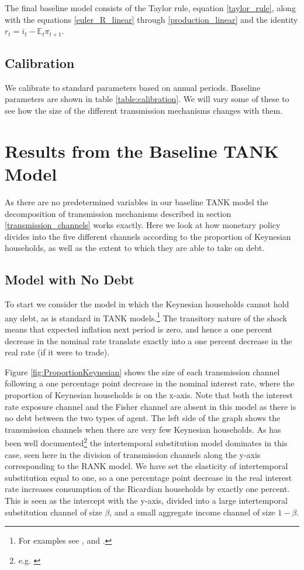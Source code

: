 \documentclass[titlepage]{\econtex}\newcommand{\texname}{ConsumptionHeterogeneity}
\begin{document}
The final baseline model consists of the Taylor rule, equation \ref{taylor_rule}, along with the equations \ref{euler_R_linear} through \ref{production_linear} and the identity $r_t = i_t - \mathbb{E}_t \pi_{t+1}$.

\subsection{Calibration}
We calibrate to standard parameters based on annual periods. Baseline parameters are shown in table \ref{table:calibration}. We will vary some of these to see how the size of the different transmission mechanisms changes with them.



\section{Results from the Baseline TANK Model}
As there are no predetermined variables in our baseline TANK model the decomposition of transmission mechanisms described in section \ref{transmission_channels} works exactly. Here we look at how monetary policy divides into the five different channels according to the proportion of Keynesian households, as well as the extent to which they are able to take on debt.

\subsection{Model with No Debt}
To start we consider the model in which the Keynesian households cannot hold any debt, as is standard in TANK models.\footnote{For examples see \cite{dgHANKTANK}, \cite{gali_understanding_2007} and \cite{broer_2018}.} The transitory nature of the shock means that expected inflation next period is zero, and hence a one percent decrease in the nominal rate translate exactly into a one percent decrease in the real rate (if it were to trade).

Figure \ref{fig:ProportionKeynesian} shows the size of each transmission channel following a one percentage point decrease in the nominal interest rate, where the proportion of Keynesian households is on the x-axis. Note that both the interest rate exposure channel and the Fisher channel are absent in this model as there is no debt between the two types of agent. The left side of the graph shows the transmission channels when there are very few Keynesian households. As has been well documented\footnote{e.g. \cite{kaplan_monetary_2016}} the intertemporal substitution model dominates in this case, seen here in the division of transmission channels along the y-axis corresponding to the RANK model. We have set the elasticity of intertemporal substitution equal to one, so a one percentage point decrease in the real interest rate increases consumption of the Ricardian households by exactly one percent. This is seen as the intercept with the y-axis, divided into a large intertemporal substitution channel of size $\beta$, and a small aggregate income channel of size $1-\beta$.
\end{document}
